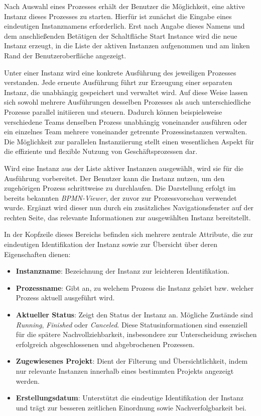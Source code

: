 \newpage
{}

Nach Auswahl eines Prozesses erhält der Benutzer die Möglichkeit, eine aktive Instanz dieses Prozesses zu starten. Hierfür ist zunächst die Eingabe eines eindeutigen Instanznamens erforderlich. Erst nach Angabe dieses Namens und dem anschließenden Betätigen der Schaltfläche Start Instance wird die neue Instanz erzeugt, in die Liste der aktiven Instanzen aufgenommen und am linken Rand der Benutzeroberfläche angezeigt.

Unter einer Instanz wird eine konkrete Ausführung des jeweiligen Prozesses verstanden. Jede erneute Ausführung führt zur Erzeugung einer separaten Instanz, die unabhängig gespeichert und verwaltet wird. Auf diese Weise lassen sich sowohl mehrere Ausführungen desselben Prozesses als auch unterschiedliche Prozesse parallel initiieren und steuern. Dadurch können beispielsweise verschiedene Teams denselben Prozess unabhängig voneinander ausführen oder ein einzelnes Team mehrere voneinander getrennte Prozessinstanzen verwalten. Die Möglichkeit zur parallelen Instanziierung stellt einen wesentlichen Aspekt für die effiziente und flexible Nutzung von Geschäftsprozessen dar.


Wird eine Instanz aus der Liste aktiver Instanzen ausgewählt, wird sie für die Ausführung vorbereitet. Der Benutzer kann die Instanz nutzen, um den zugehörigen Prozess schrittweise zu durchlaufen. Die Darstellung erfolgt im bereits bekannten \textit{BPMN-Viewer}, der zuvor zur Prozessvorschau verwendet wurde. Ergänzt wird dieser nun durch ein zusätzliches Navigationsfenster auf der rechten Seite, das relevante Informationen zur ausgewählten Instanz bereitstellt.

In der Kopfzeile dieses Bereichs befinden sich mehrere zentrale Attribute, die zur eindeutigen Identifikation der Instanz sowie zur Übersicht über deren Eigenschaften dienen:

\begin{itemize}
    \item \textbf{Instanzname}: Bezeichnung der Instanz zur leichteren Identifikation.
    \item \textbf{Prozessname}: Gibt an, zu welchem Prozess die Instanz gehört bzw. welcher Prozess aktuell ausgeführt wird.
    \item \textbf{Aktueller Status}: Zeigt den Status der Instanz an. Mögliche Zustände sind \textit{Running}, \textit{Finished} oder \textit{Canceled}. Diese Statusinformationen sind essenziell für die spätere Nachvollziehbarkeit, insbesondere zur Unterscheidung zwischen erfolgreich abgeschlossenen und abgebrochenen Prozessen.
    \item \textbf{Zugewiesenes Projekt}: Dient der Filterung und Übersichtlichkeit, indem nur relevante Instanzen innerhalb eines bestimmten Projekts angezeigt werden.
    \item \textbf{Erstellungsdatum}: Unterstützt die eindeutige Identifikation der Instanz und trägt zur besseren zeitlichen Einordnung sowie Nachverfolgbarkeit bei.
\end{itemize}

